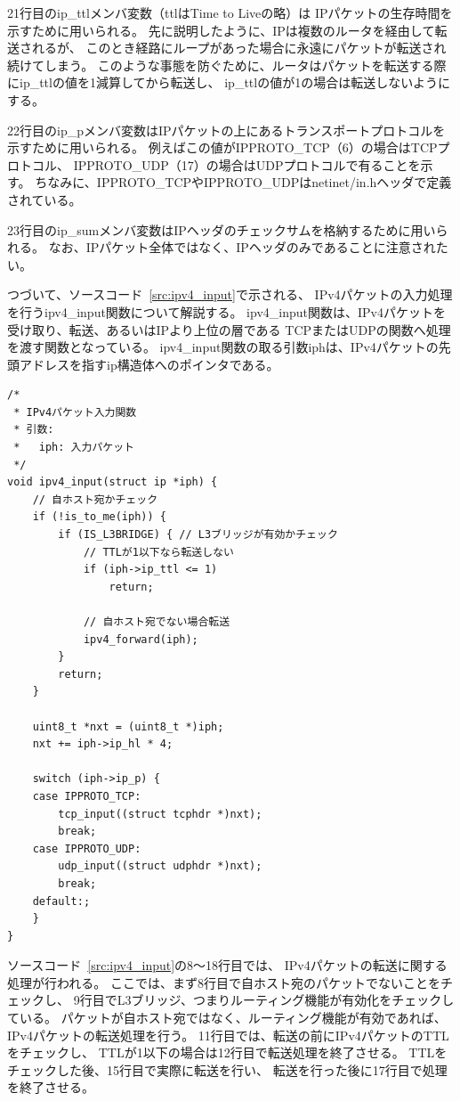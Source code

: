 21行目のip\_ttlメンバ変数（ttlはTime to Liveの略）は
IPパケットの生存時間を示すために用いられる。
先に説明したように、IPは複数のルータを経由して転送されるが、
このとき経路にループがあった場合に永遠にパケットが転送され続けてしまう。
このような事態を防ぐために、ルータはパケットを転送する際にip\_ttlの値を1減算してから転送し、
ip\_ttlの値が1の場合は転送しないようにする。

22行目のip\_pメンバ変数はIPパケットの上にあるトランスポートプロトコルを示すために用いられる。
例えばこの値がIPPROTO\_TCP（6）の場合はTCPプロトコル、
IPPROTO\_UDP（17）の場合はUDPプロトコルで有ることを示す。
ちなみに、IPPROTO\_TCPやIPPROTO\_UDPはnetinet/in.hヘッダで定義されている。

23行目のip\_sumメンバ変数はIPヘッダのチェックサムを格納するために用いられる。
なお、IPパケット全体ではなく、IPヘッダのみであることに注意されたい。

つづいて、ソースコード~\ref{src:ipv4_input}で示される、
IPv4パケットの入力処理を行うipv4\_input関数について解説する。
ipv4\_input関数は、IPv4パケットを受け取り、転送、あるいはIPより上位の層である
TCPまたはUDPの関数へ処理を渡す関数となっている。
ipv4\_input関数の取る引数iphは、IPv4パケットの先頭アドレスを指すip構造体へのポインタである。

\begin{lstlisting}[caption=ipv4\_input関数,label=src:ipv4_input]
/*
 * IPv4パケット入力関数
 * 引数:
 *   iph: 入力パケット
 */
void ipv4_input(struct ip *iph) {
    // 自ホスト宛かチェック
    if (!is_to_me(iph)) {
        if (IS_L3BRIDGE) { // L3ブリッジが有効かチェック
            // TTLが1以下なら転送しない
            if (iph->ip_ttl <= 1)
                return;

            // 自ホスト宛でない場合転送
            ipv4_forward(iph);
        }
        return;
    }

    uint8_t *nxt = (uint8_t *)iph;
    nxt += iph->ip_hl * 4;

    switch (iph->ip_p) {
    case IPPROTO_TCP:
        tcp_input((struct tcphdr *)nxt);
        break;
    case IPPROTO_UDP:
        udp_input((struct udphdr *)nxt);
        break;
    default:;
    }
}
\end{lstlisting}

ソースコード~\ref{src:ipv4_input}の8〜18行目では、
IPv4パケットの転送に関する処理が行われる。
ここでは、まず8行目で自ホスト宛のパケットでないことをチェックし、
9行目でL3ブリッジ、つまりルーティング機能が有効化をチェックしている。
パケットが自ホスト宛ではなく、ルーティング機能が有効であれば、IPv4パケットの転送処理を行う。
11行目では、転送の前にIPv4パケットのTTLをチェックし、
TTLが1以下の場合は12行目で転送処理を終了させる。
TTLをチェックした後、15行目で実際に転送を行い、
転送を行った後に17行目で処理を終了させる。

